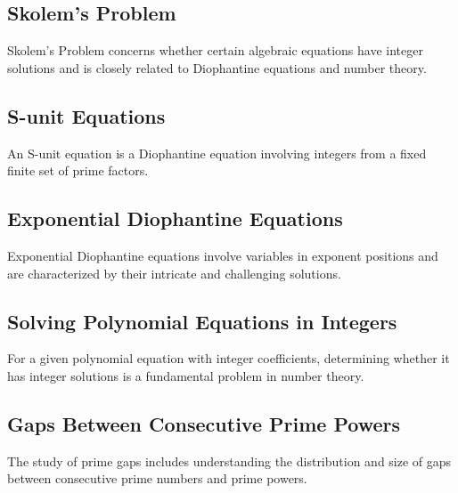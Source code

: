 \documentclass{article}
\begin{document}
\subsection{Skolem's Problem}

\begin{definition}
Skolem's Problem concerns whether certain algebraic equations have integer solutions and is closely related to Diophantine equations and number theory.
\end{definition}

\subsection{S-unit Equations}

\begin{definition}
An S-unit equation is a Diophantine equation involving integers from a fixed finite set of prime factors.
\end{definition}

\subsection{Exponential Diophantine Equations}

\begin{definition}
Exponential Diophantine equations involve variables in exponent positions and are characterized by their intricate and challenging solutions.
\end{definition}

\subsection{Solving Polynomial Equations in Integers}

\begin{theorem}
For a given polynomial equation with integer coefficients, determining whether it has integer solutions is a fundamental problem in number theory.
\end{theorem}

\subsection{Gaps Between Consecutive Prime Powers}

\begin{definition}
The study of prime gaps includes understanding the distribution and size of gaps between consecutive prime numbers and prime powers.
\end{definition}
\end{document}
